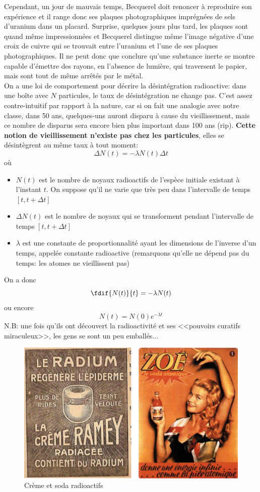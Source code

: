Cependant, un jour de mauvais temps, Becquerel doit renoncer à reproduire son expérience et il range donc ses plaques photographiques imprégnées de sels d'uranium dans un placard. Surprise, quelques jours plus tard, les plaques sont quand même impressionnées et Becquerel distingue même l'image négative d'une croix de cuivre qui se trouvait entre l'uranium et l'une de ses plaques photographiques. Il ne peut donc que conclure qu'une substance inerte se montre capable d'émettre des rayons, en l'absence de lumière, qui traversent le papier, mais sont tout de même arrêtés par le métal. \\

On a une loi de comportement pour décrire la désintégration radioactive: dans une boîte avec $N$ particules, le taux de désintégration ne change pas. C'est assez contre-intuitif par rapport à la nature, car si on fait une analogie avec notre classe, dans 50 ans, quelques-uns auront disparu à cause du vieillissement, mais ce nombre de disparus sera encore bien plus important dans 100 ans (rip). \textbf{Cette notion de vieillissement n'existe pas chez les particules}, elles se désintègrent au même taux à tout moment:
\[    \Delta N(t)=-\lambda N(t) \Delta t    \]
où
\begin{itemize}
    \item $N(t)$ est le nombre de noyaux radioactifs de l'espèce initiale existant à l'instant $t$. On suppose qu'il ne varie que très peu dans l'intervalle de temps $[t,t+\Delta t]$
    \item $\Delta N(t)$ est le nombre de noyaux qui se transforment pendant l'intervalle de temps $[t,t+\Delta t]$
    \item $\lambda$ est une constante de proportionnalité ayant les dimensions de l'inverse d'un temps, appelée constante radioactive (remarquons qu'elle ne dépend pas du temps: les atomes ne vieillissent pas)
\end{itemize}
On a donc
\[
    \fdif{N(t)}{t}=-\lambda N(t)
\]
ou encore
\[
    N(t)=N(0)e^{-\lambda t}
\]
N.B: une fois qu'ils ont découvert la radioactivité et ses <<pouvoirs curatifs miraculeux>>, les gens se sont un peu emballés...

\begin{figure}[H]
    \centering
    \includegraphics[scale=0.60]{Images1/produits.png}
    \caption{Crème et soda radioactifs}
\end{figure}


